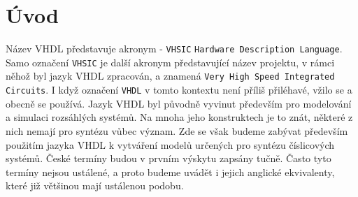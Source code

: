   \section{Úvod}
    Název VHDL představuje akronym - \texttt{VHSIC} \texttt{Hardware Des\-cription Language}. Samo 
    označení \texttt{VHSIC} je další akronym představující název projektu, v rámci něhož byl jazyk 
    VHDL zpracován, a znamená \texttt{Very High Speed Integrated Circuits}. I když označení 
    \texttt{VHDL} v tomto kontextu není příliš přiléhavé, vžilo se a obecně se používá. Jazyk VHDL 
    byl původně vyvinut především pro modelování a simulaci rozsáhlých systémů. Na mnoha jeho 
    konstruktech je to znát, některé z nich nemají pro syntézu vůbec význam. Zde se však budeme 
    zabývat především použitím jazyka VHDL k vytváření modelů určených pro syntézu číslicových 
    systémů. České termíny budou v prvním výskytu zapsány tučně. Často tyto termíny nejsou 
    ustálené, a proto budeme uvádět i jejich anglické ekvivalenty, které již většinou mají 
    ustálenou podobu.

